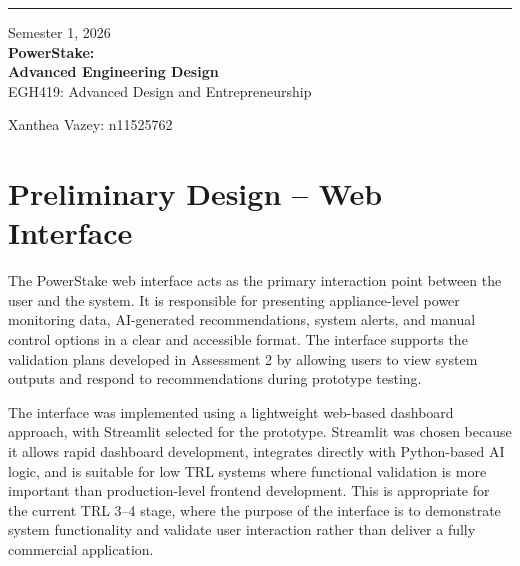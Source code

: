 \documentclass[11pt, twoside, a4paper]{article}
\newcommand{\TitleName}{PowerStake: \\ Advanced Engineering Design}
\newcommand{\unitTime}{Semester 1, 2026}
\newcommand{\unitName}{EGH419: Advanced Design and Entrepreneurship}
\newcommand{\documentAuthors}{Xanthea Vazey: n11525762}
\begin{document}
\begin{titlepage}
    \thispagestyle{empty}
    \vspace*{0.2\textheight}
    
    \noindent
    \begin{minipage}[t]{0.03\textwidth}
        \rule[-25ex]{1pt}{140pt}   %
    \end{minipage}
    \hspace{1em}
    \begin{minipage}[t]{0.9\textwidth}
        \raggedright
        \normalsize{\unitTime} \\[2ex]
        \Huge\textbf{\TitleName} \\[2ex]
        \normalsize{\unitName}
    \end{minipage}
    
    \vfill
    \begin{flushleft}
        \documentAuthors
    \end{flushleft}
\end{titlepage}

\newpage
{}



\section{Preliminary Design -- Web Interface}

The PowerStake web interface acts as the primary interaction point between the user and the system. It is responsible for presenting appliance-level power monitoring data, AI-generated recommendations, system alerts, and manual control options in a clear and accessible format. The interface supports the validation plans developed in Assessment 2 by allowing users to view system outputs and respond to recommendations during prototype testing.

The interface was implemented using a lightweight web-based dashboard approach, with Streamlit selected for the prototype. Streamlit was chosen because it allows rapid dashboard development, integrates directly with Python-based AI logic, and is suitable for low TRL systems where functional validation is more important than production-level frontend development. This is appropriate for the current TRL 3--4 stage, where the purpose of the interface is to demonstrate system functionality and validate user interaction rather than deliver a fully commercial application.
\end{document}
